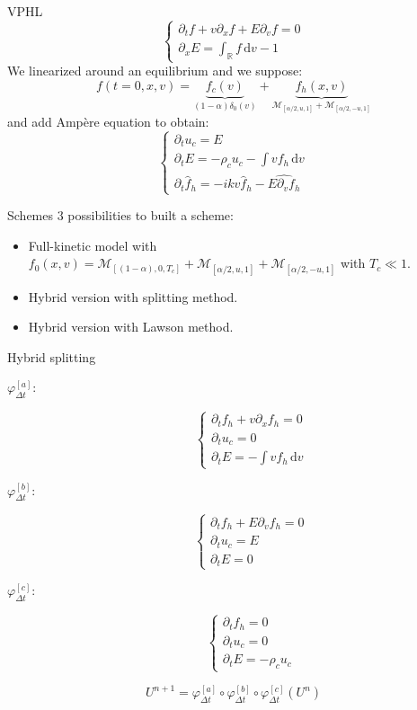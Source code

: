 \documentclass{beamer}
\begin{document}
\begin{frame}{VPHL}
  $$
    \begin{cases}
      \partial_tf + v\partial_xf + E\partial_vf = 0 \\
      \partial_xE = \int_\mathbb{R} f\,\mathrm{d}v - 1
    \end{cases}
  $$
  We linearized around an equilibrium and we suppose:
  $$
    f(t=0,x,v) = \underbrace{f_c(v)}_{(1-\alpha)\delta_0(v)} + \underbrace{f_h(x,v)}_{\mathcal{M}_{[\alpha/2,u,1]}+\mathcal{M}_{[\alpha/2,-u,1]}}
  $$
  and add Ampère equation to obtain:
  $$
    \begin{cases}
      \partial_t u_c = E \\
      \partial_t E = -\rho_cu_c - \int vf_h\,\mathrm{d}v \\
      \partial_t \hat{f}_h = -ikv\hat{f}_h - \widehat{E\partial_v f_h}
    \end{cases}
  $$
\end{frame}
\begin{frame}{Schemes}
  3 possibilities to built a scheme:
  \begin{itemize}
    \item Full-kinetic model with $f_0(x,v) = \mathcal{M}_{[(1-\alpha),0,T_c]}+\mathcal{M}_{[\alpha/2,u,1]}+\mathcal{M}_{[\alpha/2,-u,1]}$ with $T_c \ll 1$.
    \item Hybrid version with splitting method.
    \item Hybrid version with Lawson method.
  \end{itemize}
\end{frame}
\begin{frame}{Hybrid splitting}
  \begin{description}
    \item[$\varphi_{\Delta t}^{[a]}$:] $$
      \begin{cases}
        \partial_t f_h + v\partial_x f_h = 0 \\
        \partial_t u_c = 0 \\
        \partial_t E = -\int vf_h\,\mathrm{d}v
      \end{cases}
    $$
    \item[$\varphi_{\Delta t}^{[b]}$:] $$
      \begin{cases}
        \partial_t f_h + E\partial_v f_h = 0 \\
        \partial_t u_c = E \\
        \partial_t E = 0
      \end{cases}
    $$
    \item[$\varphi_{\Delta t}^{[c]}$:] $$
      \begin{cases}
        \partial_t f_h = 0 \\
        \partial_t u_c = 0 \\
        \partial_t E = -\rho_cu_c
      \end{cases}
    $$
  \end{description}
  $$
    U^{n+1} = \varphi^{[a]}_{\Delta t} \circ \varphi^{[b]}_{\Delta t} \circ \varphi^{[c]}_{\Delta t} (U^n)
  $$
\end{frame}
\end{document}
